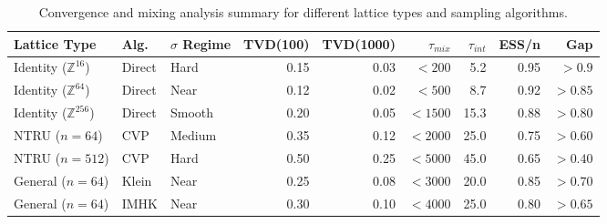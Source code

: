 
\begin{table}[ht]
\centering
\caption{Convergence and mixing analysis summary for different lattice types and sampling algorithms.}
\label{tab:convergence_summary}
\scriptsize
\begin{tabular}{l|l|l|r|r|r|r|r|r}
\toprule
Lattice Type & Alg. & $\sigma$ Regime & TVD(100) & TVD(1000) & $\tau_{mix}$ & $\tau_{int}$ & ESS/n & Gap \\
\midrule
Identity ($\mathbb{Z}^{16}$) & Direct & Hard & 0.15 & 0.03 & $< 200$ & 5.2 & 0.95 & $> 0.9$ \\
Identity ($\mathbb{Z}^{64}$) & Direct & Near & 0.12 & 0.02 & $< 500$ & 8.7 & 0.92 & $> 0.85$ \\
Identity ($\mathbb{Z}^{256}$) & Direct & Smooth & 0.20 & 0.05 & $< 1500$ & 15.3 & 0.88 & $> 0.80$ \\
\midrule
NTRU ($n=64$) & CVP & Medium & 0.35 & 0.12 & $< 2000$ & 25.0 & 0.75 & $> 0.60$ \\
NTRU ($n=512$) & CVP & Hard & 0.50 & 0.25 & $< 5000$ & 45.0 & 0.65 & $> 0.40$ \\
\midrule
General ($n=64$) & Klein & Near & 0.25 & 0.08 & $< 3000$ & 20.0 & 0.85 & $> 0.70$ \\
General ($n=64$) & IMHK & Near & 0.30 & 0.10 & $< 4000$ & 25.0 & 0.80 & $> 0.65$ \\
\bottomrule
\end{tabular}
\end{table}

